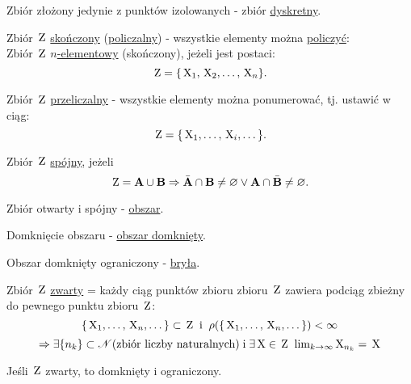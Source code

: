 \begin{mydef}
     Zbiór złożony jedynie z punktów izolowanych - zbiór \underline{dyskretny}.
\end{mydef}

\begin{mydef}
     Zbiór $\mathbf{\,\textnormal{Z}}$ \underline{skończony} (\underline{policzalny}) - wszystkie elementy można \underline{policzyć}:\\
     Zbiór $\mathbf{\,\textnormal{Z}}$ \underline{$n$-elementowy} (skończony), jeżeli jest postaci:
     \[\mathbf{\,\textnormal{Z}} = \{\,\textnormal{X}_1, \,\textnormal{X}_2, \dots, \,\textnormal{X}_n\}.\]
\end{mydef}

\begin{mydef}
     Zbiór $\mathbf{\,\textnormal{Z}}$ \underline{przeliczalny} - wszystkie elementy można ponumerować, tj. ustawić w ciąg:
     \[\mathbf{\,\textnormal{Z}} = \{\,\textnormal{X}_1, \dots, \,\textnormal{X}_i, \dots\}.\]
\end{mydef}

\begin{mydef}
     Zbiór $\mathbf{\,\textnormal{Z}}$ \underline{spójny}, jeżeli
     \[\mathbf{\,\textnormal{Z}} = \mathbf{A} \cup \mathbf{B} \Rightarrow \bar{\mathbf{A}} \cap \mathbf{B} \neq \varnothing \vee \mathbf{A} \cap \bar{\mathbf{B}} \neq \varnothing.\]
\end{mydef}

\begin{mydef}
    Zbiór otwarty i spójny - \underline{obszar}.
\end{mydef}

\begin{mydef}
    Domknięcie obszaru - \underline{obszar domknięty}.
\end{mydef}

\begin{mydef}
    Obszar domknięty ograniczony - \underline{bryła}. 
\end{mydef}

\begin{mydef}
    Zbiór $\mathbf{\,\textnormal{Z}}$ \underline{zwarty} = każdy ciąg punktów zbioru zbioru $\mathbf{\,\textnormal{Z}}$ zawiera podciąg zbieżny do pewnego punktu zbioru $\mathbf{\,\textnormal{Z}}$:
    \[\{\,\textnormal{X}_1,\dots,\,\textnormal{X}_n,\dots\} \subset \mathbf{\,\textnormal{Z}} \;\;\text{i}\;\; \rho(\{\,\textnormal{X}_1, \dots, \,\textnormal{X}_n, \dots\}) < \infty \]
    \[\Rightarrow \exists\{n_k\} \subset \mathscr{N} (\text{zbiór liczby naturalnych}) \;\text{i}\; \exists \,\textnormal{X} \in \mathbf{\,\textnormal{Z}} \;\;\text{lim}_{k\to\infty}\,\textnormal{X}_{n_k} = \,\textnormal{X}\]
\end{mydef}

\begin{info}
    Jeśli $\mathbf{\,\textnormal{Z}}$ zwarty, to domknięty i ograniczony.
\end{info}

